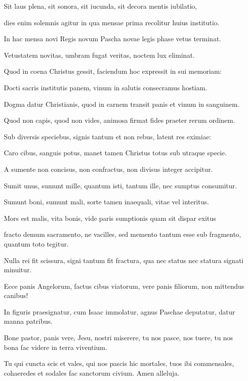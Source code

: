 \documentclass[parskip=full]{scrreprt}
\newif\iftemplate\templatetrue
\begin{document}
Sit laus plena, sit sonora,
sit iucunda, sit decora
mentis iubilatio,

dies enim solemnis agitur
in qua mensae prima recolitur
huius institutio.

In hac mensa novi Regis
novum Pascha novae legis
phase vetus terminat.

Vetustatem novitas,
umbram fugat veritas,
noctem lux eliminat.

Quod in coena Christus gessit,
faciendum hoc expressit
in sui memoriam:

Docti sacris institutis
panem, vinum in salutis
consecramus hostiam.

Dogma datur Christianis,
quod in carnem transit panis
et vinum in sanguinem.

Quod non capis, quod non vides,
animosa firmat fides
praeter rerum ordinem.

Sub diversis speciebus,
signis tantum et non rebus,
latent res eximiae:

Caro cibus, sanguis potus,
manet tamen Christus totus
sub utraque specie.

A sumente non concisus,
non confractus, non divisus
integer accipitur.

Sumit unus, sumunt mille,
quantum isti, tantum ille,
nec sumptus consumitur.

Sumunt boni, sumunt mali,
sorte tamen inaequali,
vitae vel interitus.

Mors est malis, vita bonis,
vide paris sumptionis
quam sit dispar exitus

fracto demum sacramento,
ne vacilles, sed memento
tantum esse sub fragmento,
quantum toto tegitur.

Nulla rei fit scissura,
signi tantum fit fractura,
qua nec status nec statura
signati minuitur.

Ecce panis Angelorum,
factus cibus viatorum,
vere panis filiorum,
non mittendus canibus!

In figuris praesignatur,
cum Isaac immolatur,
agnus Paschae deputatur,
datur manna patribus.

Bone pastor, panis vere,
Jesu, nostri miserere,
tu nos pasce, nos tuere,
tu nos bona fac videre
in terra viventium.

Tu qui cuncta scis et vales,
qui nos pascis hic mortales,
tuos ibi commensales,
cohaeredes et sodales
fac sanctorum civium.
Amen alleluja.

\cleardoublepage
\fi

\iftemplate

\fi
\end{document}
